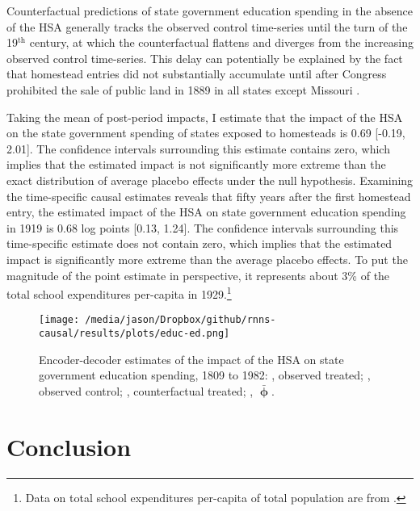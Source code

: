 \documentclass[hidelinks,12pt]{article}
\DeclareRobustCommand\sampleline[1]{%
	\tikz\draw[#1] (0,0) (0,\the\dimexpr\fontdimen22\textfont2\relax)
	-- (2em,\the\dimexpr\fontdimen22\textfont2\relax);%
}
\begin{document}
Counterfactual predictions of state government education spending in the absence of the HSA generally tracks the observed control time-series until the turn of the 19$^\text{th}$ century, at which the counterfactual flattens and diverges from the increasing observed control time-series. This delay can potentially be explained by the fact that homestead entries did not substantially accumulate until after Congress prohibited the sale of public land in 1889 in all states except Missouri \citep{gates1941land,gates1979federal}. 

Taking the mean of post-period impacts, I estimate that the impact of the HSA on the state government spending of states exposed to homesteads is 0.69 [-0.19, 2.01]. The confidence intervals surrounding this estimate contains zero, which implies that the estimated impact is not significantly more extreme than the exact distribution of average placebo effects under the null hypothesis. Examining the time-specific causal estimates reveals that fifty years after the first homestead entry, the estimated impact of the HSA on state government education spending in 1919 is 0.68 log points [0.13, 1.24]. The confidence intervals surrounding this time-specific estimate does not contain zero, which implies that the estimated impact is significantly more extreme than the average placebo effects. To put the magnitude of the point estimate in perspective, it represents about 3\% of the total school expenditures per-capita in 1929.\footnote{Data on total school expenditures per-capita of total population are from \citet{snyder2010digest}.}
 
\begin{figure}[htbp]
	\centering
	\texttt{[image: /media/jason/Dropbox/github/rnns-causal/results/plots/educ-ed.png]}
	\caption{Encoder-decoder estimates of the impact of the HSA on state government education spending, 1809 to 1982:		{\color{Darjeeling15}{\sampleline{}}}, observed treated;
		{\color{Darjeeling11}{\sampleline{dashed}}}, observed control;
		{\color{Darjeeling15}{\sampleline{dotted}}}, counterfactual treated;
		{\color{Darjeeling15}{\sampleline{dash pattern=on .7em off .2em on .05em off .2em}}}, $\boldsymbol{\bar{\upphi}}$.\label{educ-ed}} 
\end{figure}

\section{Conclusion} \label{conclusion}
\end{document}
